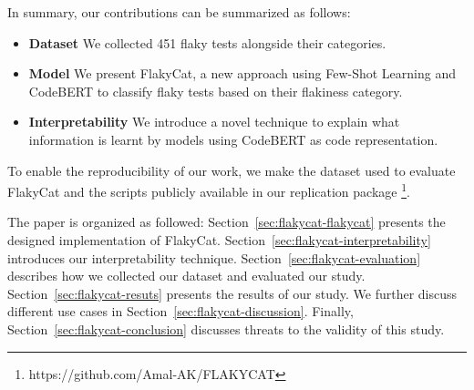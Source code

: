In summary, our contributions can be summarized as follows:
 \begin{itemize}
    \item \textbf{Dataset} We collected 451 flaky tests alongside their categories. 
     \item \textbf{Model} We present FlakyCat, a new approach using Few-Shot Learning and CodeBERT to classify flaky tests based on their flakiness category. 
     \item \textbf{Interpretability} We introduce a novel technique to explain what information is learnt by models using CodeBERT as code representation.
 \end{itemize}

To enable the reproducibility of our work, we make the dataset used to evaluate FlakyCat and the scripts publicly available in our replication package \footnote{https://github.com/Amal-AK/FLAKYCAT}.

The paper is organized as followed: Section~\ref{sec:flakycat-flakycat} presents the designed implementation of FlakyCat. Section~\ref{sec:flakycat-interpretability} introduces our interpretability technique. Section~\ref{sec:flakycat-evaluation} describes how we collected our dataset and evaluated our study. Section~\ref{sec:flakycat-resuts} presents the results of our study. We further discuss different use cases in Section~\ref{sec:flakycat-discussion}. Finally, Section~\ref{sec:flakycat-conclusion} discusses threats to the validity of this study.